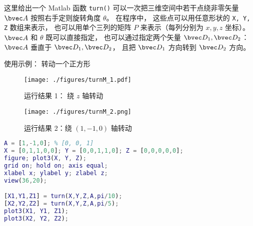 

这里给出一个 Matlab 函数 \verb|turn()| 可以一次把三维空间中若干点绕非零矢量 $\bvec A$ 按照右手定则旋转角度 $\theta$。 在程序中， 这些点可以用任意形状的 \verb|X, Y, Z| 数组来表示， 也可以用单个三列的矩阵 $P$ 来表示（每列分别为 $x, y, z$ 坐标）。 $\bvec A$ 和 $\theta$ 既可以直接指定， 也可以通过指定两个矢量 $\bvec D_1, \bvec D_2$： $\bvec A$ 垂直于 $\bvec D_1, \bvec D_2$， 且把 $\bvec D_1$ 方向转到 $\bvec D_2$ 方向。

使用示例： 转动一个正方形
\begin{figure}[ht]
\centering
\texttt{[image: ./figures/turnM\_1.pdf]}
\caption{运行结果 1： 绕 $z$ 轴转动} \label{turnM_fig1}
\end{figure}
\begin{figure}[ht]
\centering
\texttt{[image: ./figures/turnM\_2.png]}
\caption{运行结果 2：绕 $(1,-1,0)$ 轴转动} \label{turnM_fig2}
\end{figure}

\begin{lstlisting}[language=matlab, caption=turn\_demo.m]
% turn_demo
A = [1,-1,0]; % [0, 0, 1]
X = [0,1,1,0,0]; Y = [0,0,1,1,0]; Z = [0,0,0,0,0];
figure; plot3(X, Y, Z);
grid on; hold on; axis equal;
xlabel x; ylabel y; zlabel z;
view(36,20);

[X1,Y1,Z1] = turn(X,Y,Z,A,pi/10);
[X2,Y2,Z2] = turn(X,Y,Z,A,pi/5);
plot3(X1, Y1, Z1);
plot3(X2, Y2, Z2);
\end{lstlisting}

